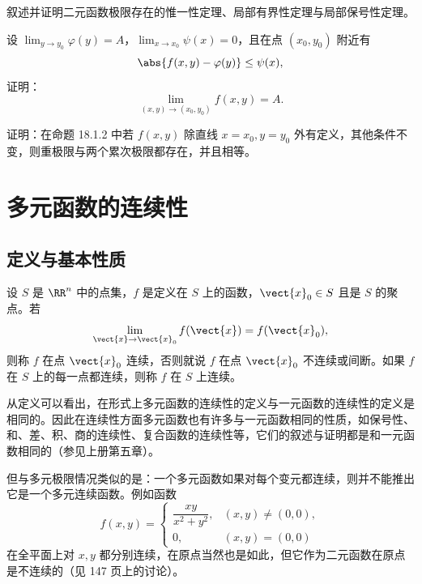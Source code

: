 \begin{xexercise}[5]
叙述并证明二元函数极限存在的惟一性定理、局部有界性定理与局部保号性定理。
\end{xexercise}

\begin{xexercise}[6]
设 $\displaystyle\lim_{y\to y_0}\varphi(y)=A$，$\displaystyle\lim_{x\to x_0}\psi(x)=0$，且在点 $(x_0,y_0)$ 附近有
  \[
    \abs{f(x,y)-\varphi(y)}\le\psi(x),
  \]
  证明：
  \[
    \lim_{(x,y)\to(x_0,y_0)}f(x,y)=A.
  \]
\end{xexercise}

\begin{xexercise}[7]
证明：在命题 18.1.2 中若 $f(x,y)$ 除直线 $x=x_0,y=y_0$ 外有定义，其他条件不变，则重极限与两个累次极限都存在，并且相等。
\end{xexercise}

\section{多元函数的连续性}

\subsection{定义与基本性质}

设 $S$ 是 $\RR^n$ 中的点集，$f$ 是定义在 $S$ 上的函数，$\vect{x}_0\in S$ 且是 $S$ 的聚点。若
\[
  \lim_{\vect{x}\to\vect{x}_0}f(\vect{x})=f(\vect{x}_0),
\]
则称 $f$ 在点 $\vect{x}_0$ 连续，否则就说 $f$ 在点 $\vect{x}_0$ 不连续或间断。如果 $f$ 在 $S$ 上的每一点都连续，则称 $f$ 在 $S$ 上连续。

从定义可以看出，在形式上多元函数的连续性的定义与一元函数的连续性的定义是相同的。因此在连续性方面多元函数也有许多与一元函数相同的性质，如保号性、和、差、积、商的连续性、复合函数的连续性等，它们的叙述与证明都是和一元函数相同的（参见上册第五章）。

但与多元极限情况类似的是：一个多元函数如果对每个变元都连续，则并不能推出它是一个多元连续函数。例如函数
\[
  f(x,y)=
  \begin{cases}
    \dfrac{xy}{x^2+y^2}, & (x,y)\ne(0,0),\\[4pt]
    0, & (x,y)=(0,0)
  \end{cases}
\]
在全平面上对 $x,y$ 都分别连续，在原点当然也是如此，但它作为二元函数在原点是不连续的（见 147 页上的讨论）。

